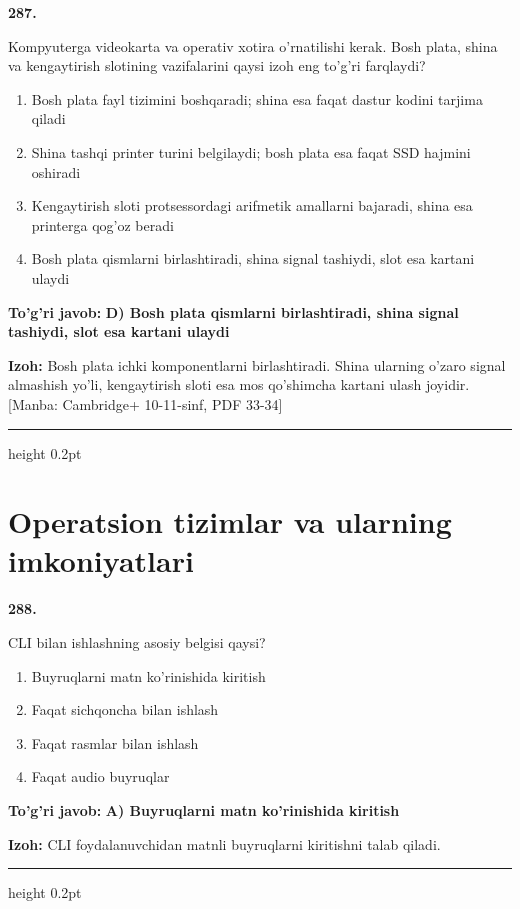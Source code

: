 \documentclass[10pt,a4paper]{article}
\begin{document}
{\bfseries\sffamily\color{ink} 287.}
\par
Kompyuterga videokarta va operativ xotira o'rnatilishi kerak. Bosh plata, shina va kengaytirish slotining vazifalarini qaysi izoh eng to'g'ri farqlaydi?
\begin{enumerate}[label=\Alph*),leftmargin=9mm]
\item Bosh plata fayl tizimini boshqaradi; shina esa faqat dastur kodini tarjima qiladi
\item Shina tashqi printer turini belgilaydi; bosh plata esa faqat SSD hajmini oshiradi
\item Kengaytirish sloti protsessordagi arifmetik amallarni bajaradi, shina esa printerga qog'oz beradi
\item Bosh plata qismlarni birlashtiradi, shina signal tashiydi, slot esa kartani ulaydi
\end{enumerate}
\begin{tcolorbox}[enhanced,breakable,colback=teal!4,colframe=teal!60!black,boxrule=0.45pt,arc=1.2mm,left=2.7mm,right=2.7mm,top=1.8mm,bottom=1.8mm,before skip=2mm,after skip=2mm]
{\bfseries\sffamily\color{teal}To'g'ri javob:} \textbf{D) Bosh plata qismlarni birlashtiradi, shina signal tashiydi, slot esa kartani ulaydi}
\par\smallskip
{\bfseries Izoh:} Bosh plata ichki komponentlarni birlashtiradi. Shina ularning o'zaro signal almashish yo'li, kengaytirish sloti esa mos qo'shimcha kartani ulash joyidir. [Manba: Cambridge+ 10-11-sinf, PDF 33-34]
\end{tcolorbox}
\vspace{2mm}\hrule height 0.2pt\vspace{3mm}
\clearpage
\section{Operatsion tizimlar va ularning imkoniyatlari}


{\bfseries\sffamily\color{ink} 288.}
\par
CLI bilan ishlashning asosiy belgisi qaysi?
\begin{enumerate}[label=\Alph*),leftmargin=9mm]
\item Buyruqlarni matn ko'rinishida kiritish
\item Faqat sichqoncha bilan ishlash
\item Faqat rasmlar bilan ishlash
\item Faqat audio buyruqlar
\end{enumerate}
\begin{tcolorbox}[enhanced,breakable,colback=teal!4,colframe=teal!60!black,boxrule=0.45pt,arc=1.2mm,left=2.7mm,right=2.7mm,top=1.8mm,bottom=1.8mm,before skip=2mm,after skip=2mm]
{\bfseries\sffamily\color{teal}To'g'ri javob:} \textbf{A) Buyruqlarni matn ko'rinishida kiritish}
\par\smallskip
{\bfseries Izoh:} CLI foydalanuvchidan matnli buyruqlarni kiritishni talab qiladi.
\end{tcolorbox}
\vspace{2mm}\hrule height 0.2pt\vspace{3mm}
\end{document}

